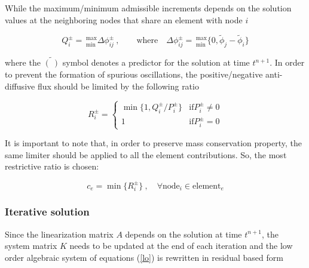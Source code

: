 While the maximum/minimum admissible increments depends on the solution values at the neighboring nodes that share an element with node $i$

\begin{equation} \label{admissible_increment}
Q_i^\pm =\, _{\min}^{\max}\Delta \phi_{ij}^\pm \ , \qquad
\text{where} \quad \Delta \phi_{ij}^\pm =\, _{\min}^{\max}
\{0, \tilde{\phi}_j - \tilde{\phi}_i\}
\end{equation}

where the $\tilde{(\ )}$ symbol denotes a predictor for the solution at time $t^{n+1}$. In order to prevent the formation of spurious oscillations, the positive/negative anti-diffusive flux should be limited by the following ratio

\begin{equation}
R_i^\pm = \begin{cases}
    \min\{1, Q_i^\pm / P_i^\pm\} & \text{if} P_i^\pm \neq 0 \\
    1 & \text{if} P_i^\pm = 0
\end{cases}
\end{equation}

It is important to note that, in order to preserve mass conservation property, the same limiter should be applied to all the element contributions. So, the most restrictive ratio is chosen:

\begin{equation}
c_e = \min\{R_i^\pm\}\ , \quad \forall \text{node}_i \in \text{element}_e
\end{equation}




\subsubsection{Iterative solution}

Since the linearization matrix $A$ depends on the solution at time $t^{n+1}$, the system matrix $K$ needs to be updated at the end of each iteration and the low order algebraic system of equations (\ref{lo}) is rewritten in residual based form

